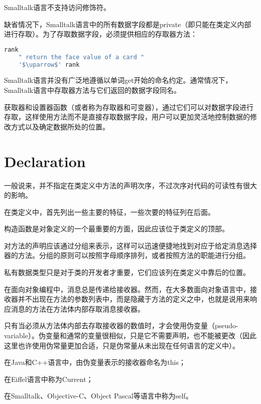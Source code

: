 Smalltalk语言不支持访问修饰符。

缺省情况下，Smalltalk语言中的所有数据字段都是private（即只能在类定义内部进行存取）。为了存取数据字段，必须提供相应的存取器方法：


\begin{lstlisting}[language=bash]
rank 
	" return the face value of a card "
	'$\uparrow$' rank
\end{lstlisting}



Smalltalk语言并没有广泛地遵循以单词get开始的命名约定。通常情况下，Smalltalk语言中存取器方法与它们返回的数据字段同名。

获取器和设置器函数（或者称为存取器和可变器），通过它们可以对数据字段进行存取，这样使用方法而不是直接存取数据字段，用户可以更加灵活地控制数据的修改方式以及确定数据所处的位置。


\section{Declaration}


一般说来，并不指定在类定义中方法的声明次序，不过次序对代码的可读性有很大的影响。

\begin{compactitem}
\item 在类定义中，首先列出一些主要的特征，一些次要的特征列在后面。
\item 构造函数是对象定义的一个最重要的方面，因此应该位于类定义的顶部。
\item 对方法的声明应该通过分组来表示，这样可以迅速便捷地找到对应于给定消息选择器的方法。分组的原则可以按照字母顺序排列，或者按照方法的职能进行分组。
\item 私有数据类型只是对于类的开发者才重要，它们应该列在类定义中靠后的位置。
\end{compactitem}


在面向对象编程中，消息总是传递给接收器。然而，在大多数面向对象语言中，接收器并不出现在方法的参数列表中，而是隐藏于方法的定义之中，也就是说用来响应消息的方法在方法体内部存取消息接收器。

只有当必须从方法体内部去存取接收器的数值时，才会使用伪变量（pseudo-variable）。伪变量和通常的变量很相似，只是它不需要声明，也不能被更改（因此这里也许使用伪常量更加合适，只是伪常量从未出现在任何语言的定义中）。

\begin{compactitem}
\item 在Java和C++语言中，由伪变量表示的接收器命名为this；
\item 在Eiffel语言中称为Current；
\item 在Smalltalk、Objective-C、Object Pascal等语言中称为self。
\end{compactitem}

